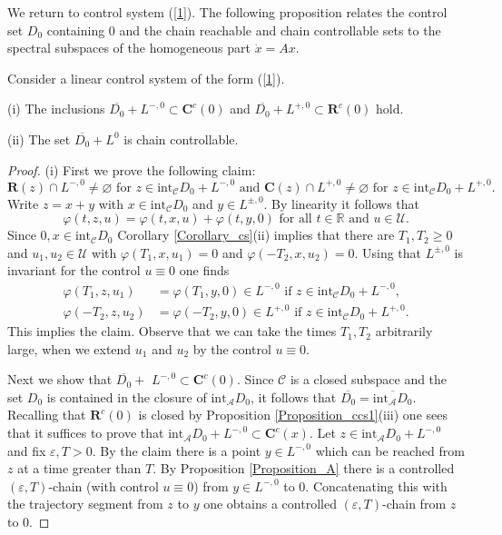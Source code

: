 \documentclass{siamltex}%
\begin{document}
We return to control system (\ref{1}). The following proposition relates the
control set $D_{0}$ containing $0$ and the chain reachable and chain
controllable sets to the spectral subspaces of the homogeneous part $\dot
{x}=Ax$.

\begin{proposition}
\label{Proposition1_2_Eduardo}Consider a linear control system of the form
(\ref{1}).

(i) The inclusions $\overline{D_{0}}+L^{-,0}\subset\mathbf{C}^{c}(0)$ and
$\overline{D_{0}}+L^{+,0}\subset\mathbf{R}^{c}(0)$ hold.

(ii) The set $\overline{D_{0}}+L^{0}$ is chain controllable.
\end{proposition}

\begin{proof}
(i) First we prove the following claim:%
\[
\mathbf{R}(z)\cap L^{-,0}\not =\varnothing\text{ for }z\in\mathrm{int}%
_{\mathcal{C}}D_{0}+L^{-,0}\text{ and }\mathbf{C}(z)\cap L^{+,0}%
\not =\varnothing\text{ for }z\in\mathrm{int}_{\mathcal{C}}D_{0}+L^{+,0}.
\]
Write $z=x+y$ with $x\in\mathrm{int}_{\mathcal{C}}D_{0}$ and $y\in L^{\pm,0}$.
By linearity it follows that%
\[
\varphi(t,z,u)=\varphi(t,x,u)+\varphi(t,y,0)\text{ for all }t\in
\mathbb{R}\text{ and }u\in\mathcal{U}.
\]
Since $0,x\in\mathrm{int}_{\mathcal{C}}D_{0}$ Corollary \ref{Corollary_cs}(ii)
implies that there are $T_{1},T_{2}\geq0$ and $u_{1},u_{2}\in\mathcal{U}$ with
$\varphi(T_{1},x,u_{1})=0$ and $\varphi(-T_{2},x,u_{2})=0$. Using that
$L^{\pm,0}$ is invariant for the control $u\equiv0$ one finds%
\begin{align*}
\varphi(T_{1},z,u_{1})  &  =\varphi(T_{1},y,0)\in L^{-,0}\text{ if }%
z\in\mathrm{int}_{\mathcal{C}}D_{0}+L^{-,0},\\
\varphi(-T_{2},z,u_{2})  &  =\varphi(-T_{2},y,0)\in L^{+,0}\text{ if }%
z\in\mathrm{int}_{\mathcal{C}}D_{0}+L^{+,0}.
\end{align*}
This implies the claim. Observe that we can take the times $T_{1},T_{2}$
arbitrarily large, when we extend $u_{1}$ and $u_{2}$ by the control
$u\equiv0$.

Next we show that $\overline{D_{0}}+$ $L^{-,0}\subset\mathbf{C}^{c}(0)$. Since
$\mathcal{C}$ is a closed subspace and the set $D_{0}$ is contained in the
closure of $\mathrm{int}_{\mathcal{A}}D_{0}$, it follows that $\overline
{D_{0}}=\overline{\mathrm{int}_{\mathcal{A}}D_{0}}$. Recalling that
$\mathbf{R}^{c}(0)$ is closed by Proposition \ref{Proposition_ccs1}(iii) one
sees that it suffices to prove that $\mathrm{int}_{\mathcal{A}}D_{0}%
+L^{-,0}\subset\mathbf{C}^{c}(x)$. Let $z\in\mathrm{int}_{\mathcal{A}}%
D_{0}+L^{-,0}$ and fix $\varepsilon,T>0$. By the claim there is a point $y\in
L^{-,0}$ which can be reached from $z$ at a time greater than $T$. By
Proposition \ref{Proposition_A}\textbf{ }there is a controlled $(\varepsilon
,T)$-chain (with control $u\equiv0$) from $y\in L^{-,0}$ to $0$. Concatenating
this with the trajectory segment from $z$ to $y$ one obtains a controlled
$(\varepsilon,T)$-chain from $z$ to $0$.


\end{proof}
\end{document}
